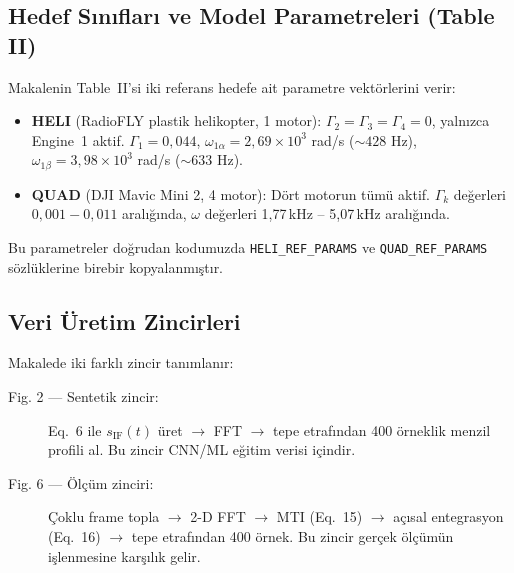 \documentclass[11pt,a4paper]{article}
\begin{document}
\subsection{Hedef Sınıfları ve Model Parametreleri (Table II)}
Makalenin Table~II'si iki referans hedefe ait parametre vektörlerini verir:
\begin{itemize}
    \item \textbf{HELI} (RadioFLY plastik helikopter, 1 motor): $\Gamma_2 = \Gamma_3 = \Gamma_4 = 0$,
          yalnızca Engine~1 aktif. $\Gamma_1 = 0{,}044$, $\omega_{1\alpha} = 2{,}69 \times 10^3$ rad/s ($\sim 428$ Hz),
          $\omega_{1\beta} = 3{,}98 \times 10^3$ rad/s ($\sim 633$ Hz).
    \item \textbf{QUAD} (DJI Mavic Mini 2, 4 motor): Dört motorun tümü aktif. $\Gamma_k$ değerleri
          $0{,}001 - 0{,}011$ aralığında, $\omega$ değerleri 1{,}77\,kHz -- 5{,}07\,kHz aralığında.
\end{itemize}
Bu parametreler doğrudan kodumuzda \texttt{HELI\_REF\_PARAMS} ve \texttt{QUAD\_REF\_PARAMS}
sözlüklerine birebir kopyalanmıştır.

\subsection{Veri Üretim Zincirleri}
Makalede iki farklı zincir tanımlanır:
\begin{description}
    \item[Fig. 2 — Sentetik zincir:] Eq.~6 ile $s_{\text{IF}}(t)$ üret $\rightarrow$ FFT $\rightarrow$
          tepe etrafından 400 örneklik menzil profili al. Bu zincir CNN/ML eğitim verisi içindir.
    \item[Fig. 6 — Ölçüm zinciri:] Çoklu frame topla $\rightarrow$ 2-D FFT $\rightarrow$ MTI
          (Eq.~15) $\rightarrow$ açısal entegrasyon (Eq.~16) $\rightarrow$ tepe etrafından
          400 örnek. Bu zincir gerçek ölçümün işlenmesine karşılık gelir.
\end{description}
\end{document}
